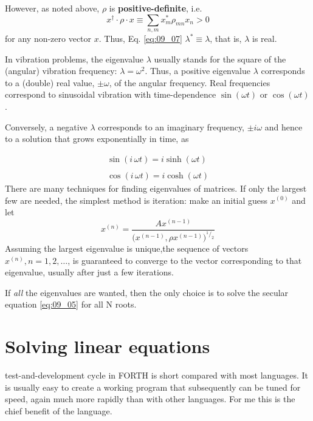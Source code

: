 However, as noted above, $\rho$ is \textbf{positive-definite}, i.e.
\begin{equation}
    \label{eq:09_08}
    x^\dagger \cdot \rho \cdot x \equiv
    \sum_{n,m} x_m^{*} \rho_{mn} x_n > 0
\end{equation}
for any non-zero vector $x$. Thus, Eq. \ref{eq:09_07} $\lambda^*\equiv\lambda$, that is, $\lambda$ is real.

In vibration problems, the eigenvalue $\lambda$ usually stands for the
square of the (angular) vibration frequency: $\lambda=\omega^2$. Thus, a positive eigenvalue $\lambda$ corresponds to a (double) real value, $\pm\omega$, of the
angular frequency. Real frequencies correspond to sinusoidal
vibration with time-dependence $\sin(\omega t)$ or $\cos(\omega t)$.

Conversely, a negative $\lambda$ corresponds to an imaginary frequency,
$\pm i \omega$ and hence to a solution that grows exponentially in time, as

\begin{align}
    \label{eq:09_09}
\sin(i\, \omega t) = i \sinh(\omega t)\nonumber \\
\\
\cos(i\, \omega t) = i \cosh(\omega t)\nonumber
\end{align}
There are many techniques for finding eigenvalues of matrices.
If only the largest few are needed, the simplest method is iteration: make an
initial guess $x^{(0)}$ and let
\begin{equation}
    x^{(n)}=\frac{A x^{(n-1)}}{\Big(x^{(n-1)}, \rho x^{(n-1)}\Big)^{^1/_2}}\nonumber
\end{equation}
Assuming the largest eigenvalue is unique,the sequence of vectors $x^{(n)} , n = 1, 2,\dotsc$, is guaranteed to converge to the vector
corresponding to that eigenvalue, usually after just a few iterations.

If \textit{all} the eigenvalues are wanted, then the only choice is to solve
the secular equation \ref{eq:09_05} for all N roots.

\section{ Solving linear equations}
 test-and-development cycle in FORTH is short compared
with most languages. It is usually easy to create a working
program that subsequently can be tuned for speed, again much
more rapidly than with other languages. For me this is the chief
benefit of the language.

